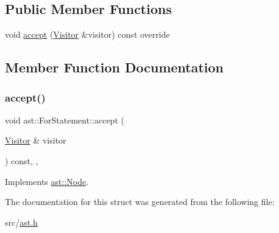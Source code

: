 \subsection*{Public Member Functions}
\begin{DoxyCompactItemize}
\item 
void \hyperlink{structast_1_1_for_statement_af2a457b14c605b01216ec6f950e36e94}{accept} (\hyperlink{structast_1_1_visitor}{Visitor} \&visitor) const override
\end{DoxyCompactItemize}


\subsection{Member Function Documentation}
\mbox{\label{structast_1_1_for_statement_af2a457b14c605b01216ec6f950e36e94}} 
\subsubsection{\texorpdfstring{accept()}{accept()}}
{\footnotesize\ttfamily void ast\+::\+For\+Statement\+::accept (\begin{DoxyParamCaption}\item[{\hyperlink{structast_1_1_visitor}{Visitor} \&}]{visitor }\end{DoxyParamCaption}) const\hspace{0.3cm}{\ttfamily [inline]}, {\ttfamily [override]}, {\ttfamily [virtual]}}



Implements \hyperlink{structast_1_1_node_abc089ee6caaf06a4445ebdd8391fdebc}{ast\+::\+Node}.



The documentation for this struct was generated from the following file\+:\begin{DoxyCompactItemize}
\item 
src/\hyperlink{ast_8h}{ast.\+h}\end{DoxyCompactItemize}
